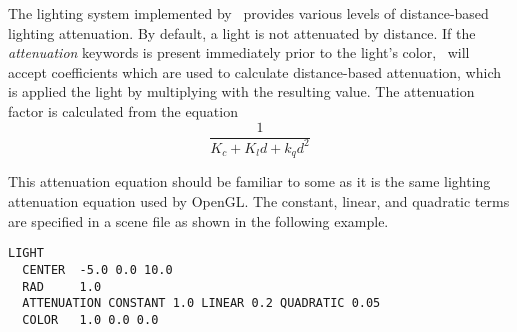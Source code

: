 The lighting system implemented by \RAY\ provides various levels of
distance-based lighting attenuation.  By default, a light is not attenuated
by distance.  If the {\em attenuation} keywords is present immediately 
prior to the light's color, \RAY\ will accept coefficients which are used 
to calculate distance-based attenuation, which is applied the light by 
multiplying with the resulting value.  The attenuation factor is calculated 
from the equation 
\begin{equation}
\label{eq:attenuation}
  \frac {1} {K_c + K_l d + k_q d^2}
\end{equation}

This attenuation equation should be familiar to some as it 
is the same lighting attenuation equation used by OpenGL.
The constant, linear, and quadratic terms are specified in a scene file
as shown in the following example.
\begin{verbatim}
LIGHT  
  CENTER  -5.0 0.0 10.0   
  RAD     1.0
  ATTENUATION CONSTANT 1.0 LINEAR 0.2 QUADRATIC 0.05
  COLOR   1.0 0.0 0.0  
\end{verbatim}


